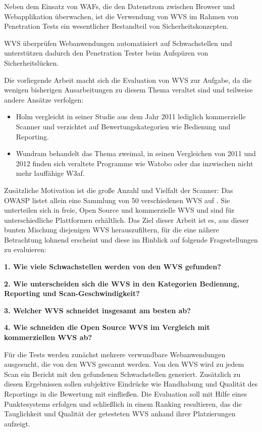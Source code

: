 \documentclass[12pt,oneside,a4paper,parskip,pointlessnumbers]{scrbook}
\begin{document}
Neben dem Einsatz von \acp{WAF}, die den Datenstrom zwischen Browser und Webapplikation überwachen, ist die Verwendung von \ac{WVS} im Rahmen von Penetration Tests ein wesentlicher Bestandteil von Sicherheitskonzepten.

WVS überprüfen Webanwendungen automatisiert auf Schwachstellen und unterstützen dadurch den Penetration Tester beim Aufspüren von Sicherheitslücken.

Die vorliegende Arbeit macht sich die Evaluation von WVS zur Aufgabe, da die wenigen bisherigen Ausarbeitungen zu diesem Thema veraltet sind und teilweise andere Ansätze verfolgen:

\begin{itemize}
  \item
  Holm vergleicht in seiner Studie aus dem Jahr 2011 lediglich kommerzielle Scanner und verzichtet auf Bewertungskategorien wie Bedienung und Reporting. \cite{Holm}
  \item
  Wundram behandelt das Thema zweimal, in seinen Vergleichen von 2011 und 2012 finden sich veraltete Programme wie Watobo oder das inzwischen nicht mehr lauffähige W3af. \cite{Wundram,wundram2}
\end{itemize}

Zusätzliche Motivation ist die große Anzahl und Vielfalt der Scanner: Das \ac{OWASP} listet allein eine Sammlung von 50 verschiedenen WVS auf \cite{OWASPtools}.
Sie unterteilen sich in freie, Open Source und kommerzielle WVS und sind für unterschiedliche Plattformen erhältlich. Das Ziel dieser Arbeit ist es, aus dieser bunten Mischung diejenigen WVS herauszufiltern, für die eine nähere Betrachtung lohnend erscheint und diese im Hinblick auf folgende Fragestellungen zu evaluieren:

\textbf{1. Wie viele Schwachstellen werden von den WVS gefunden?}

\textbf{2. Wie unterscheiden sich die WVS in den Kategorien Bedienung, Reporting und Scan-Geschwindigkeit?}

\textbf{3. Welcher WVS schneidet insgesamt am besten ab?}

\textbf{4. Wie schneiden die Open Source WVS im Vergleich mit kommerziellen WVS ab?}

Für die Tests werden zunächst mehrere verwundbare Webanwendungen ausgesucht, die von den WVS gescannt werden. Von den WVS wird zu jedem Scan ein Bericht mit den gefundenen Schwachstellen generiert. Zusätzlich zu diesen Ergebnissen sollen subjektive Eindrücke wie Handhabung und Qualität des Reportings in die Bewertung mit einfließen.
Die Evaluation soll mit Hilfe eines Punktesystems erfolgen und schließlich in einem Ranking resultieren, das die Tauglichkeit und Qualität der getesteten WVS anhand ihrer Platzierungen aufzeigt.
\end{document}
